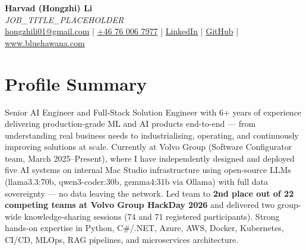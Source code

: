 \documentclass[a4paper,10pt]{article}
\begin{document}
\pagestyle{empty}

\begin{center}
{\LARGE \textbf{Harvad (Hongzhi) Li}}\\[10pt]
{\Large \textit{JOB_TITLE_PLACEHOLDER}}\\[10pt]
\textcolor{linkedinblue}{
  \href{mailto:hongzhili01@gmail.com}{hongzhili01@gmail.com} |
  \href{tel:+46760067977}{+46 76 006 7977} |
  \href{https://www.linkedin.com/in/harvad/}{LinkedIn} |
  \href{https://github.com/bluehawana}{GitHub} |
  \href{https://www.bluehawana.com}{www.bluehawana.com}
}
\end{center}

\section*{Profile Summary}
Senior AI Engineer and Full-Stack Solution Engineer with 6+ years of experience delivering production-grade ML and AI products end-to-end --- from understanding real business needs to industrialising, operating, and continuously improving solutions at scale. Currently at Volvo Group (Software Configurator team, March 2025--Present), where I have independently designed and deployed five AI systems on internal Mac Studio infrastructure using open-source LLMs (llama3.3:70b, qwen3-coder:30b, gemma4:31b via Ollama) with full data sovereignty --- no data leaving the network. Led team to \textbf{2nd place out of 22 competing teams at Volvo Group HackDay 2026} and delivered two group-wide knowledge-sharing sessions (74 and 71 registered participants). Strong hands-on expertise in Python, C\#/.NET, Azure, AWS, Docker, Kubernetes, CI/CD, MLOps, RAG pipelines, and microservices architecture.

\end{document}
